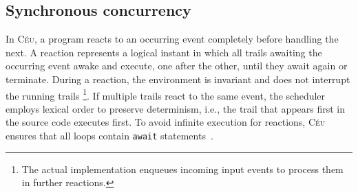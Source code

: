 \documentclass{sigplanconf}
\newcommand{\CEU}{\textsc{C\'{e}u}\xspace}
\newcommand{\code}[1] {{\small{\texttt{#1}}}}
\newcommand{\1}{\;}
\newcommand{\2}{\;\;}
\newcommand{\3}{\;\;\;}
\newcommand{\5}{\;\;\;\;\;}
\begin{document}

\subsection{Synchronous concurrency}
\label{sec.ceu.sync}

In \CEU, a program reacts to an occurring event completely before handling the 
next.
%
A reaction represents a logical instant in which all trails awaiting the 
occurring event awake and execute, one after the other, until they await again 
or terminate.
%
During a reaction, the environment is invariant and does not interrupt the 
running trails%
\footnote{
The actual implementation enqueues incoming input events to process them in 
further reactions.
}.
If multiple trails react to the same event, the scheduler employs lexical order 
to preserve determinism, i.e., the trail that appears first in the source code 
executes first.
%
To avoid infinite execution for reactions, \CEU ensures that all loops contain 
\code{await} statements~\cite{ceu.sensys13}.
\end{document}
